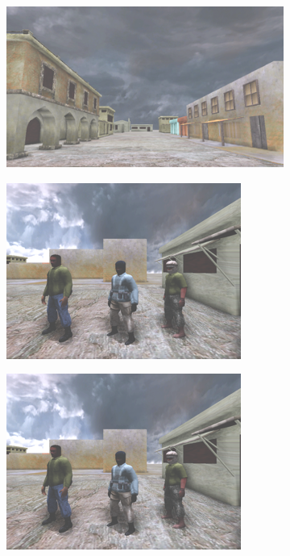 \documentclass[preprint,authoryear,12pt]{elsarticle}
\begin{document}
\begin{figure}
\centering
\begin{subfigure}{0.3\textwidth}
\centering
\includegraphics[width=\textwidth]{figures/stimulus-movement}
\caption{}
\label{fig:stimulus-movement}
\end{subfigure}
\begin{subfigure}{0.3\textwidth}
\centering
\includegraphics[width=\textwidth]{figures/stimulus-characters}
\caption{}
\label{fig:stimulus-characters}
\end{subfigure}
\begin{subfigure}{0.3\textwidth}
\centering
\includegraphics[width=\textwidth]{figures/stimulus-location}

\end{subfigure}
\end{figure}
\end{document}
